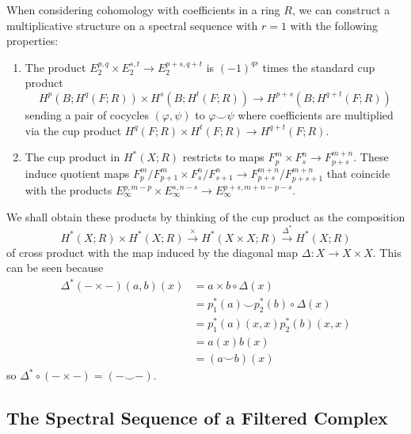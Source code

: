 \documentclass[reqno]{amsart}
\theoremstyle{definition}
\theoremstyle{remark}
\begin{document}
When considering cohomology with
coefficients in a ring $R$, we can
construct a multiplicative structure on a spectral sequence
with $r = 1$
with the following properties:
\begin{enumerate}
    \item The product
        $E_2^{p,q} \times E_2^{s,t} \to 
        E_2^{p+s,q+t}$ is
        $(-1)^{qs}$ times the standard cup product
        \[
        H^{p}(B; H^{q}(F;R)) \times H^{s}(B;
        H^{t}(F;R)) \to H^{p+s}(B;H^{q+t}(F;R))
        \] 
        sending a pair of cocycles
        $\left( \varphi , \psi  \right) $ to
        $\varphi \smile \psi $ where coefficients
        are multiplied via the cup product
        $H^{q}(F;R) \times H^{t}(F;R) \to H^{q+t}(F;R)$.
    \item The cup product in $H^{*}(X;R)$ restricts
        to  maps $F_p^{m} \times F_s^{n} \to F_{p+s}^{m+n}$.
        These induce quotient maps 
        $F_p^{m} / F_{p+1}^{m} \times F_s^{n} / F_{s+1}^{n} \to 
        F_{p+s}^{m+n} / F_{p+s+1}^{m+n}$ that coincide
        with the products
        $E_{\infty}^{p,m-p} \times E_{\infty}^{s,n-s} \to 
        E_{\infty}^{p+s, m+n-p-s}$.
\end{enumerate}


We shall obtain these products by thinking of the cup product
as the composition
\[
H^{*}(X;R) \times H^{*}(X;R) \stackrel{\times }{\to} 
H^{*}(X \times X; R) \stackrel{\Delta^*}{\to} 
H^{*}(X;R)
\] 
of cross product with the map induced by the
diagonal map $\Delta \colon X \to X \times X$.
This can be seen because
\begin{align*}
    \Delta^{*}  (- \times -) (a,b) (x)
    &= a \times b \circ \Delta (x)\\
    &= p_1^{*}(a) \smile p_2^{*}(b) \circ \Delta (x)\\
    &= p_1^{*}(a)(x,x) p_2^{*}(b)(x,x)\\
    &= a(x) b(x)\\
    &= (a \smile b)(x)
\end{align*}
so
$\Delta^{*} \circ (- \times -) = (- \smile -)$.





\newpage




\subsection{The Spectral Sequence of a Filtered
Complex}
\end{document}
